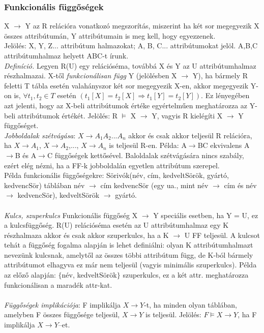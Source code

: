 \documentclass[margin=0px]{article}
\begin{document}
\subsubsection{Funkcionális függőségek}

X $\to$ Y az R relációra vonatkozó megszorítás, miszerint ha két sor megegyezik X összes attribútumán, Y attribútumain is meg kell, hogy egyezzenek. \\
Jelölés: X, Y, Z... attribútum halmazokat; A, B, C... attribútumokat jelöl. {A,B,C} attribútumhalmaz helyett ABC-t írunk. \\
\textit{Definíció.} Legyen R(U) egy relációséma, továbbá X és Y az U attribútumhalmaz részhalmazai. X-től \textit{funkcionálisan függ} Y (jelölésben X $\to$ Y), ha bármely R feletti T tábla esetén valahányszor két sor megegyezik X-en, akkor megegyezik Y-on is, $\forall t_1, t_2 \in T$ esetén $(t_1[X]=t_2[X] \Rightarrow t_1[Y]=t_2[Y])$. Ez lényegében azt jelenti, hogy az X-beli attribútumok értéke egyértelműen meghatározza az Y-beli attribútumok értékét. Jelölés: R $\models$ X $\to$ Y, vagyis
R kielégíti X $\to$ Y függőséget. \\
\textit{Jobboldalak szétvágása}: $X \to A_1A_2...A_n$ akkor és csak akkor teljesül R relációra, ha $X \to A_1$, $X \to A_2$,..., $X \to A_n$ is teljesül R-en. Példa: A$\to$BC ekvivalens A$\to$B és
A$\to$C függőségek kettősével. Baloldalak szétvágására nincs szabály, ezért elég nézni, ha a FF-k jobboldalán egyetlen attribútum szerepel. \\
Példa funkcionális függőségekre: Sörivók(név, cím, kedveltSörök, gyártó, kedvencSör) táblában név $\to$ cím kedvencSör (egy ua., mint név $\to$ cím és név $\to$ kedvencSör), kedveltSörök $\to$ gyártó. \\ \\
\textit{Kulcs, szuperkulcs} Funkcionális függőség X $\to$ Y speciális esetben, ha Y = U, ez a kulcsfüggőség. R(U) relációséma esetén az U attribútumhalmaz egy K részhalmaza akkor és csak akkor szuperkulcs, ha a K $\to$ U FF teljesül. A kulcsot tehát a függőség fogalma alapján is lehet definiálni: olyan K attribútumhalmazt nevezünk kulcsnak, amelytől az összes többi attribútum függ, de K-ból bármely attribútumot elhagyva ez már nem teljesül (vagyis minimális szuperkulcs). Példa az előző alapján: $\{$név, kedveltSörök$\}$ szuperkulcs, ez a két attr. meghatározza funkcionálisan a maradék attr-kat. \\ \\
\textit{Függőségek implikációja}: F implikálja $X \to Y$-t, ha minden olyan táblában, amelyben F összes függősége teljesül, $X \to Y$ is teljesül. Jelölés: $F \models X \to Y$, ha F implikálja $X \to Y$–et. \\
\end{document}
